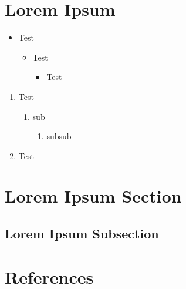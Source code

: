 \documentclass[final,hyperref={pdfpagelabels=false},table]{beamer}
\begin{document}
\begin{frame}
\begin{columns}[T]
\begin{column}{\colCWidth}
\justifying

\section{Lorem Ipsum}
\blindtext
\begin{itemize}
	\item Test
	\begin{itemize}
		\item Test
		\begin{itemize}
			\item Test
		\end{itemize}
	\end{itemize}
\end{itemize}
\justifying\blindtext
\begin{enumerate}
	\item Test
	\begin{enumerate}
		\item sub
		\begin{enumerate}
			\item subsub
		\end{enumerate}
	\end{enumerate}
	\item Test
\end{enumerate}

\section{Lorem Ipsum Section}
\blindtext[2]

\subsection{Lorem Ipsum Subsection}
\blindtext[1]

\nocite{*} %
\section{References}



\end{column}
\end{columns}

\end{frame}
\end{document}
